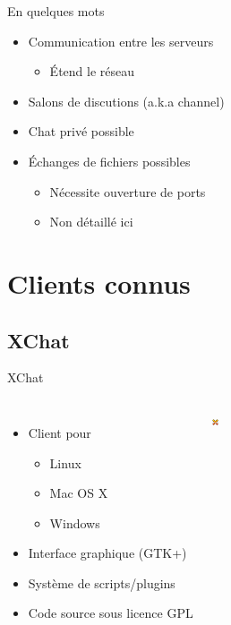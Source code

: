 \documentclass{beamer}
\begin{document}
\begin{frame}{En quelques mots}
\begin{itemize}	
	\itemsep1.3em
		\item Communication entre les serveurs
		\begin{itemize}
			\item Étend le réseau
		\end{itemize}
		\item Salons de discutions (a.k.a channel)
		\item Chat privé possible
		\item Échanges de fichiers possibles
		\begin{itemize}
			\item Nécessite ouverture de ports
			\item Non détaillé ici
		\end{itemize}
\end{itemize}
\end{frame}

\section{Clients connus}

	\subsection{XChat} %
\begin{frame}{XChat}
\begin{columns}
		\begin{itemize}	
			\itemsep1.3em
				\item Client pour
				\begin{itemize}
					\item Linux
					\item Mac OS X
					\item Windows
				\end{itemize}
				\item Interface graphique (GTK+)
				\item Système de scripts/plugins
				\item Code source sous licence GPL
		\end{itemize}
		\href{https://commons.wikimedia.org/wiki/File:Logo_xchat.png}{\hspace{3cm} \includegraphics[width=0.15\textwidth]{images/Logo_xchat.png}}
\end{columns}
\end{frame}
\end{document}
